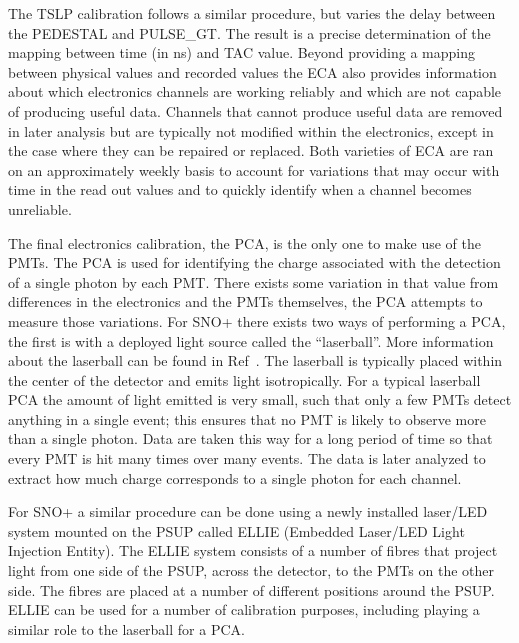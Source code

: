The TSLP calibration follows a similar procedure, but varies the delay between
the PEDESTAL and PULSE\_GT\@.
The result is a precise determination of the mapping between time (in ns) and
TAC value.
Beyond providing a mapping between physical values and recorded values the ECA
also provides information about which electronics channels are working reliably
and which are not capable of producing useful data.
Channels that cannot produce useful data are removed in later analysis but are
typically not modified within the electronics, except in the case where they
can be repaired or replaced.
Both varieties of ECA are ran on an approximately weekly basis to account for
variations that may occur with time in the read out values and to quickly
identify when a channel becomes unreliable.

The final electronics calibration, the PCA, is the only one to make use of the PMTs.
The PCA is used for identifying the charge associated with the detection of a single
photon by each PMT\@.
There exists some variation in that value from differences in the
electronics and the PMTs themselves, the PCA attempts to measure those variations.
For SNO+ there exists two ways of performing a PCA, the first is with a deployed light
source called the ``laserball''.
More information about the laserball can be found in Ref~\citep{sno_laserball}.
The laserball is typically placed within the center of the
detector and emits light isotropically. For a typical laserball PCA the amount of light emitted
is very small, such that only a few PMTs detect anything in a single event;
this ensures that no PMT is likely to observe more than a single photon.
Data are taken this way for a long period of time so that every PMT is hit many times over
many events. The data is later analyzed to extract how much charge corresponds to a single
photon for each channel.

For SNO+ a similar procedure can be done using a newly installed laser/LED system
mounted on the PSUP called ELLIE (Embedded Laser/LED Light Injection Entity).
The ELLIE system consists of a number of fibres that project light from one
side of the PSUP, across the detector, to the PMTs on the other side.
The fibres are placed at a number of different positions around the PSUP\@.
ELLIE can be used for a number of calibration purposes, including playing a
similar role to the laserball for a PCA\@.

